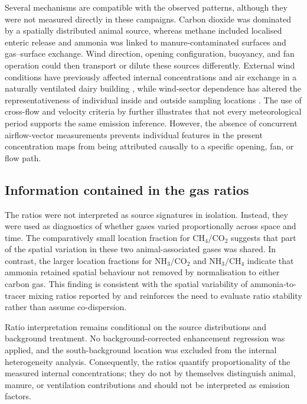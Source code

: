 \documentclass[12pt,a4paper]{article}
\begin{document}
Several mechanisms are compatible with the observed patterns, although they
were not measured directly in these campaigns. Carbon dioxide was dominated
by a spatially distributed animal source, whereas methane included localised
enteric release and ammonia was linked to manure-contaminated surfaces and
gas--surface exchange. Wind direction, opening configuration, buoyancy, and
fan operation could then transport or dilute these sources differently.
External wind conditions have previously affected internal concentrations and
air exchange in a naturally ventilated dairy building \citep{Saha2013}, while
wind-sector dependence has altered the representativeness of individual
inside and outside sampling locations \citep{Koenig2018,JankeSampling2020}.
The use of cross-flow and velocity criteria by \citet{Schmithausen2018}
further illustrates that not every meteorological period supports the same
emission inference. However, the absence of concurrent airflow-vector
measurements prevents individual
features in the present concentration maps from being attributed causally to
a specific opening, fan, or flow path.

\subsection{Information contained in the gas ratios}

The ratios were not interpreted as source signatures in isolation. Instead,
they were used as diagnostics of whether gases varied proportionally across
space and time. The comparatively small location fraction for
\(\mathrm{CH_4}/\mathrm{CO_2}\) suggests that part of the spatial variation
in these two animal-associated gases was shared. In contrast, the larger
location fractions for \(\mathrm{NH_3}/\mathrm{CO_2}\) and
\(\mathrm{NH_3}/\mathrm{CH_4}\) indicate that ammonia retained spatial
behaviour not removed by normalisation to either carbon gas. This finding is
consistent with the spatial variability of ammonia-to-tracer mixing ratios
reported by \citet{Mendes2015} and reinforces the need to evaluate ratio
stability rather than assume co-dispersion.

Ratio interpretation remains conditional on the source distributions and
background treatment. No background-corrected enhancement regression was
applied, and the south-background location was excluded from the internal
heterogeneity analysis. Consequently, the ratios quantify proportionality of
the measured internal concentrations; they do not by themselves distinguish
animal, manure, or ventilation contributions and should not be interpreted as
emission factors.
\end{document}
